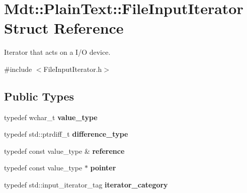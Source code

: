 \hypertarget{struct_mdt_1_1_plain_text_1_1_file_input_iterator}{}\section{Mdt\+:\+:Plain\+Text\+:\+:File\+Input\+Iterator Struct Reference}
\label{struct_mdt_1_1_plain_text_1_1_file_input_iterator}


Iterator that acts on a I/O device.  




{\ttfamily \#include $<$File\+Input\+Iterator.\+h$>$}

\subsection*{Public Types}
\begin{DoxyCompactItemize}
\item 
typedef wchar\+\_\+t {\bfseries value\+\_\+type}\hypertarget{struct_mdt_1_1_plain_text_1_1_file_input_iterator_ac74eecb0d836fbaf39b108d54bc58f25}{}\label{struct_mdt_1_1_plain_text_1_1_file_input_iterator_ac74eecb0d836fbaf39b108d54bc58f25}

\item 
typedef std\+::ptrdiff\+\_\+t {\bfseries difference\+\_\+type}\hypertarget{struct_mdt_1_1_plain_text_1_1_file_input_iterator_a9c2fdcc79abcebddef12d8f3f96fc96f}{}\label{struct_mdt_1_1_plain_text_1_1_file_input_iterator_a9c2fdcc79abcebddef12d8f3f96fc96f}

\item 
typedef const value\+\_\+type \& {\bfseries reference}\hypertarget{struct_mdt_1_1_plain_text_1_1_file_input_iterator_af7242124a6e19a8a589341b2328e008a}{}\label{struct_mdt_1_1_plain_text_1_1_file_input_iterator_af7242124a6e19a8a589341b2328e008a}

\item 
typedef const value\+\_\+type $\ast$ {\bfseries pointer}\hypertarget{struct_mdt_1_1_plain_text_1_1_file_input_iterator_a4c542e6b43042268c2ef8152ac347929}{}\label{struct_mdt_1_1_plain_text_1_1_file_input_iterator_a4c542e6b43042268c2ef8152ac347929}

\item 
typedef std\+::input\+\_\+iterator\+\_\+tag {\bfseries iterator\+\_\+category}\hypertarget{struct_mdt_1_1_plain_text_1_1_file_input_iterator_a676420dc494f4cf9e22b56088f1d09f4}{}\label{struct_mdt_1_1_plain_text_1_1_file_input_iterator_a676420dc494f4cf9e22b56088f1d09f4}

\end{DoxyCompactItemize}
